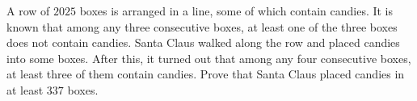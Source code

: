 A row of $2025$ boxes is arranged in a line, some of which contain candies. It is known that among any three consecutive boxes, at least one of the three boxes does not contain candies. Santa Claus walked along the row and placed candies into some boxes. After this, it turned out that among any four consecutive boxes, at least three of them contain candies. Prove that Santa Claus placed candies in at least $337$ boxes.
